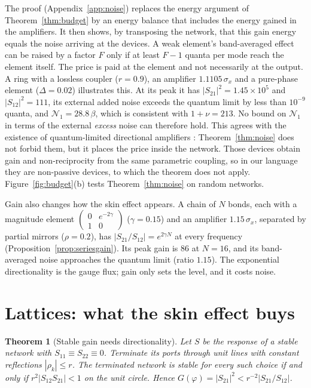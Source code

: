 \documentclass[aps,pra,twocolumn,superscriptaddress,floatfix,nofootinbib]{revtex4-2}
\newtheorem{theorem}{Theorem}
\theoremstyle{definition}
\newcommand{\NN}{\mathcal N_1}
\begin{document}
The proof (Appendix~\ref{app:noise}) replaces the energy argument of Theorem~\ref{thm:budget} by an energy balance that includes the energy gained in the amplifiers. It then shows, by transposing the network, that this gain energy equals the noise arriving at the devices. A weak element's band-averaged effect can be raised by a factor $F$ only if at least $F-1$ quanta per mode reach the element itself. The price is paid at the element and not necessarily at the output. A ring with a lossless coupler ($r=0.9$), an amplifier $1.1105\,\sigma_x$ and a pure-phase element ($\Delta=0.02$) illustrates this. At its peak it has $|S_{21}|^2=1.45\times10^5$ and $|S_{12}|^2=111$, its external added noise exceeds the quantum limit by less than $10^{-9}$ quanta, and $\NN=28.8\,\beta$, which is consistent with $1+\nu=213$. No bound on $\NN$ in terms of the external \emph{excess} noise can therefore hold. This agrees with the existence of quantum-limited directional amplifiers \cite{Kam11,MC15,Mal18}: Theorem~\ref{thm:noise} does not forbid them, but it places the price inside the network. Those devices obtain gain and non-reciprocity from the same parametric coupling, so in our language they are non-passive devices, to which the theorem does not apply. Figure~\ref{fig:budget}(b) tests Theorem~\ref{thm:noise} on random networks.

Gain also changes how the skin effect appears. A chain of $N$ bonds, each with a magnitude element $\left(\begin{smallmatrix}0&e^{-2\gamma}\\1&0\end{smallmatrix}\right)$ ($\gamma=0.15$) and an amplifier $1.15\,\sigma_x$, separated by partial mirrors ($\rho=0.2$), has $|S_{21}/S_{12}|=e^{2\gamma N}$ at every frequency (Proposition~\ref{prop:seriesgain}). Its peak gain is $86$ at $N=16$, and its band-averaged noise approaches the quantum limit (ratio $1.15$). The exponential directionality is the gauge flux; gain only sets the level, and it costs noise.

\section{Lattices: what the skin effect buys}\label{sec:lattice}

\begin{theorem}[Stable gain needs directionality]\label{thm:stab}
Let $S$ be the response of a stable network with $S_{11}\equiv S_{22}\equiv0$. Terminate its ports through unit lines with constant reflections $|\rho_k|\le r$. The terminated network is stable for every such choice if and only if $r^2|S_{12}S_{21}|<1$ on the unit circle. Hence $G(\varphi)=|S_{21}|^2<r^{-2}|S_{21}/S_{12}|$.
\end{theorem}
\end{document}
